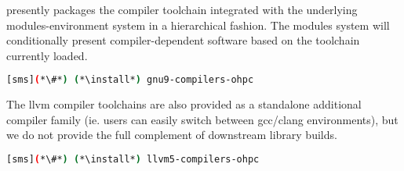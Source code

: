 \OHPC{} presently packages the \GNU{} compiler toolchain integrated with the 
underlying modules-environment system in a hierarchical fashion. The modules
system will conditionally present compiler-dependent software based on the
toolchain currently loaded. 

\begin{lstlisting}[language=bash]
[sms](*\#*) (*\install*) gnu9-compilers-ohpc
\end{lstlisting}

The llvm compiler toolchains are also provided as a standalone additional
compiler family (ie. users can easily switch between gcc/clang environments),
but we do not provide the full complement of downstream library builds.

\begin{lstlisting}[language=bash]
[sms](*\#*) (*\install*) llvm5-compilers-ohpc
\end{lstlisting}
